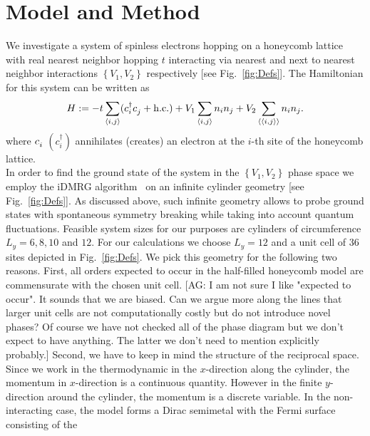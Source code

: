\documentclass[aps,prx,10pt,twocolumn,floatfix,superscriptaddress,showpacs,numerical,footinbib]{revtex4-1}
\newcommand{\noteAG}[1]{{\color{blue} [AG: #1]}}
\begin{document}
\section{\label{sec:modandmeth}Model and Method}
%
We investigate a system of spinless electrons hopping on a honeycomb lattice with real nearest neighbor hopping $t$ interacting via nearest and next to nearest neighbor interactions 
$\left\lbrace V_{1},V_{2}\right\rbrace$ respectively [see Fig.~\ref{fig:Defs}]. 
%
The Hamiltonian for this system can be written as
\begin{equation}
%
 H:=-t\sum_{\left\langle i,j\right\rangle}(c^{\dagger}_{i}c^{\vphantom{\dagger}}_{j}+ \mathrm{h.c.})+
V_{1}\sum_{\left\langle i,j\right\rangle }n_{i}n_{j}+
%
V_{2}\sum_{\left\langle \left\langle i,j\right\rangle \right\rangle }n_{i}n_{j}.
%
\label{eq:H}
\end{equation}
%
where $c_{i}^{\vphantom{\dagger}}$ $(c^{\dagger}_{i})$  annihilates (creates) an electron at the $i$-th site of the honeycomb lattice.\\
%
In order to find the ground state of the system in the $\left\lbrace V_{1},V_{2}\right\rbrace$ phase space
we employ the iDMRG algorithm~\cite{M08,W92,KZM13} on an infinite cylinder geometry [see Fig.~\ref{fig:Defs}].
%
As discussed above, such infinite geometry allows to probe ground states with spontaneous 
symmetry breaking while taking into account quantum fluctuations.
%
Feasible system sizes for our purposes are cylinders of circumference $L_{y} = 6,8,10$ and $12$.
%
For our calculations we choose $L_y=12$ and a unit cell of 36 sites depicted in Fig.~\ref{fig:Defs}.
%
%
We pick this geometry for the following two reasons.
%
First, all orders expected to occur in the half-filled honeycomb model are commensurate with the chosen unit cell.
\noteAG{I am not sure I like "expected to occur". It sounds that we are biased.
Can we argue more along the lines that larger unit cells are not computationally costly 
but do not introduce novel phases? Of course we have not checked all of the phase diagram but we don't 
expect to have anything. The latter we don't need to mention explicitly probably.}
%
Second, we have to keep in mind the structure of the reciprocal space.
%
Since we work in the thermodynamic in the $x$-direction along the cylinder, the momentum in $x$-direction is a continuous quantity.
%
However in the finite $y$-direction around the cylinder, the momentum is a discrete variable.
%
In the non-interacting case, the model forms a Dirac semimetal with the Fermi surface consisting of the 
\end{document}
